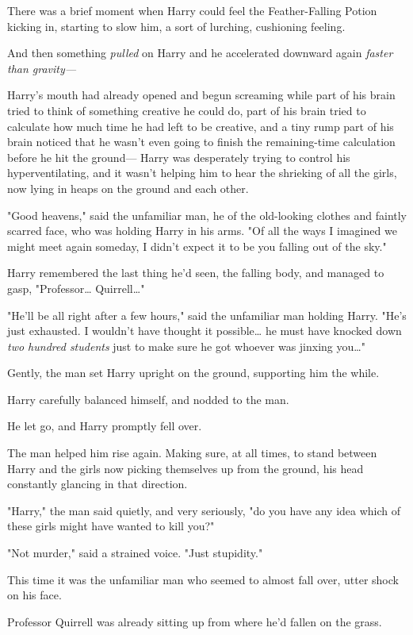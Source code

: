 There was a brief moment when Harry could feel the Feather-Falling Potion 
kicking in, starting to slow him, a sort of lurching, cushioning feeling.

And then something \emph{pulled} on Harry and he accelerated downward again 
\emph{faster than gravity---}

Harry's mouth had already opened and begun screaming while part of his brain 
tried to think of something creative he could do, part of his brain tried to 
calculate how much time he had left to be creative, and a tiny rump part of his 
brain noticed that he wasn't even going to finish the remaining-time 
calculation before he hit the ground---
\sbreak
Harry was desperately trying to control his hyperventilating, and it wasn't 
helping him to hear the shrieking of all the girls, now lying in heaps on the 
ground and each other.

"Good heavens," said the unfamiliar man, he of the old-looking clothes and 
faintly scarred face, who was holding Harry in his arms. "Of all the ways I 
imagined we might meet again someday, I didn't expect it to be you falling out 
of the sky."

Harry remembered the last thing he'd seen, the falling body, and managed to 
gasp, "Professor{\ldots} Quirrell{\ldots}"

"He'll be all right after a few hours," said the unfamiliar man holding Harry. 
"He's just exhausted. I wouldn't have thought it possible{\ldots} he must have 
knocked down \emph{two hundred students} just to make sure he got whoever was 
jinxing you{\ldots}"

Gently, the man set Harry upright on the ground, supporting him the while.

Harry carefully balanced himself, and nodded to the man.

He let go, and Harry promptly fell over.

The man helped him rise again. Making sure, at all times, to stand between 
Harry and the girls now picking themselves up from the ground, his head 
constantly glancing in that direction.

"Harry," the man said quietly, and very seriously, "do you have any idea which 
of these girls might have wanted to kill you?"

"Not murder," said a strained voice. "Just stupidity."

This time it was the unfamiliar man who seemed to almost fall over, utter shock 
on his face.

Professor Quirrell was already sitting up from where he'd fallen on the grass.

